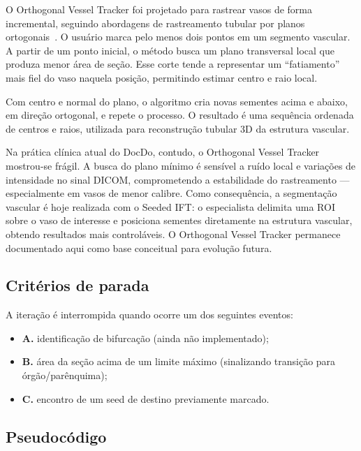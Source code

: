 \documentclass[12pt,a4paper]{article}
\begin{document}
O Orthogonal Vessel Tracker foi projetado para rastrear vasos de forma incremental, seguindo abordagens de rastreamento tubular por planos ortogonais~\cite{aylward2002}. O usuário marca pelo menos dois pontos em um segmento vascular. A partir de um ponto inicial, o método busca um plano transversal local que produza menor área de seção. Esse corte tende a representar um ``fatiamento'' mais fiel do vaso naquela posição, permitindo estimar centro e raio local.

Com centro e normal do plano, o algoritmo cria novas sementes acima e abaixo, em direção ortogonal, e repete o processo. O resultado é uma sequência ordenada de centros e raios, utilizada para reconstrução tubular 3D da estrutura vascular.

Na prática clínica atual do DocDo, contudo, o Orthogonal Vessel Tracker mostrou-se frágil. A busca do plano mínimo é sensível a ruído local e variações de intensidade no sinal DICOM, comprometendo a estabilidade do rastreamento — especialmente em vasos de menor calibre. Como consequência, a segmentação vascular é hoje realizada com o Seeded IFT: o especialista delimita uma ROI sobre o vaso de interesse e posiciona sementes diretamente na estrutura vascular, obtendo resultados mais controláveis. O Orthogonal Vessel Tracker permanece documentado aqui como base conceitual para evolução futura.

\subsection{Critérios de parada}

A iteração é interrompida quando ocorre um dos seguintes eventos:
\begin{itemize}
	\item \textbf{A.} identificação de bifurcação (ainda não implementado);
	\item \textbf{B.} área da seção acima de um limite máximo (sinalizando transição para órgão/parênquima);
	\item \textbf{C.} encontro de um seed de destino previamente marcado.
\end{itemize}

\subsection{Pseudocódigo}
\end{document}
